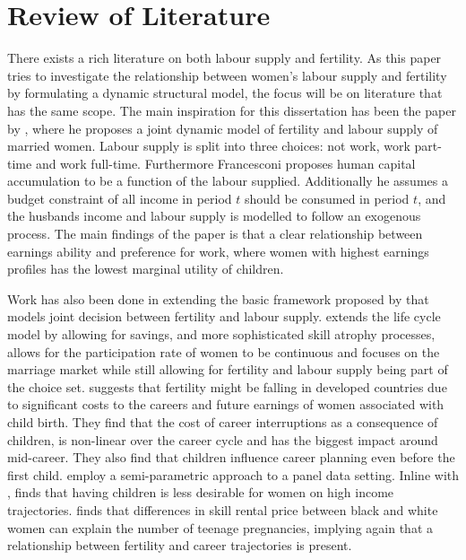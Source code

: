 \section{Review of Literature}\label{sec:lit_review}

There exists a rich literature on both labour supply and fertility. As this paper tries to investigate the relationship between women's labour supply and fertility by formulating a dynamic  structural model, the focus will be on literature that has the same scope. The main inspiration for this dissertation has been the paper by \textcite{francesconi_joint_2002}, where he proposes a joint dynamic model of fertility and labour supply of married women. Labour supply is split into three choices: not work, work part-time and work full-time. Furthermore Francesconi proposes human capital accumulation to be a function of the labour supplied. Additionally he assumes a budget constraint of all income in period $t$ should be consumed in period $t$, and the husbands income and labour supply is modelled to follow an exogenous process.  The main findings of the paper is that a clear relationship between earnings ability and preference for work, where women with highest earnings profiles has the lowest marginal utility of children.

Work has also been done in extending the basic framework proposed by \textcite{francesconi_joint_2002} that models joint decision between fertility and labour supply.  \textcite{adda_career_2011} extends the life cycle model by allowing for savings, and more sophisticated skill atrophy processes,  \textcite{gayle_life-cyle_2006} allows for the participation rate of women to be continuous and \textcite{keane_role_2010} focuses on the marriage market while still allowing for fertility and labour supply being part of the choice set. \textcite{adda_career_2011} suggests that fertility might be falling in developed countries due to significant costs to the careers and future earnings of women associated with child birth. They find that the cost of career interruptions as a consequence of children, is non-linear over the career cycle and has the biggest impact around mid-career. They also find that children influence career planning even before the first child. \textcite{gayle_life-cyle_2006} employ a semi-parametric approach to a panel data setting. Inline with \textcite{francesconi_joint_2002}, \textcite{gayle_life-cyle_2006} finds that having children is less desirable for women on high income trajectories. \textcite{keane_role_2010} finds that differences in skill rental price between black and white women can explain the number of teenage pregnancies, implying again that a relationship between fertility and career trajectories is present.

